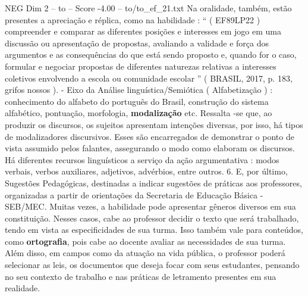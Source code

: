 \begin{textsample}{NEG Dim 2 – to – Score -4.00 – to/to\_ef\_21.txt}
Na oralidade, também, estão presentes a apreciação e réplica, como na habilidade : “ ( EF89LP22 ) compreender e comparar as diferentes posições e interesses em jogo em uma discussão ou apresentação de propostas, avaliando a validade e força dos argumentos e as consequências do que está sendo proposto e, quando for o caso, formular e negociar propostas de diferentes naturezas relativas a interesses coletivos envolvendo a escola ou comunidade escolar ” ( BRASIL, 2017, p. 183, grifos nossos ). - Eixo da Análise linguística/Semiótica ( Alfabetização ) : conhecimento do alfabeto do português do Brasil, construção do sistema alfabético, pontuação, morfologia, \textbf{modalização} etc.
Ressalta -se que, ao produzir os discursos, os sujeitos apresentam intenções diversas, por isso, há tipos de modalizadores discursivos.
Esses são encarregados de demonstrar o ponto de vista assumido pelos falantes, assegurando o modo como elaboram os discursos.
Há diferentes recursos linguísticos a serviço da ação argumentativa : modos verbais, verbos auxiliares, adjetivos, advérbios, entre outros. 6.
E, por último, Sugestões Pedagógicas, destinadas a indicar sugestões de práticas aos professores, organizadas a partir de orientações da Secretaria de Educação Básica - SEB/MEC.
Muitas vezes, a habilidade pode apresentar gêneros diversos em sua constituição.
Nesses casos, cabe ao professor decidir o texto que será trabalhado, tendo em vista as especificidades de sua turma.
Isso também vale para conteúdos, como \textbf{ortografia}, pois cabe ao docente avaliar as necessidades de sua turma.
Além disso, em campos como da atuação na vida pública, o professor poderá selecionar as leis, os documentos que deseja focar com seus estudantes, pensando no seu contexto de trabalho e nas práticas de letramento presentes em sua realidade.

\end{textsample}
